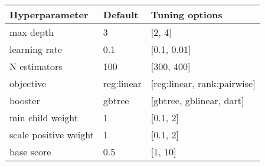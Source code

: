 
\begin{tabular}{|l|l|l|} 
\hline
\textbf{Hyperparameter}& \textbf{Default} & \textbf{Tuning options}\\
\hline
max depth & 3 & [2, 4]\\
\hline
learning rate & 0.1 & [0.1, 0.01] \\
\hline
N estimators & 100 & [300, 400] \\
\hline
objective & reg:linear & [reg:linear, rank:pairwise] \\
\hline
booster & gbtree & [gbtree, gblinear, dart] \\
\hline
min child weight & 1 & [0.1, 2] \\
\hline
scale positive weight & 1& [0.1, 2] \\
\hline
base score & 0.5 & [1, 10] \\
\hline
\end{tabular}
